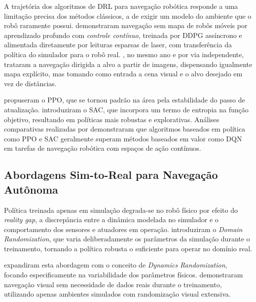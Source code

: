 A trajetória dos algoritmos de \ac{DRL} para navegação robótica responde a uma limitação precisa dos métodos clássicos, a de exigir um modelo do ambiente que o robô raramente possui. %
 demonstraram navegação sem mapa de robôs móveis por aprendizado
profundo com \emph{controle contínuo}, treinada por \ac{DDPG} assíncrono e alimentada
diretamente por leituras esparsas de laser, com transferência da política do simulador
para o robô real. , no mesmo ano e por via independente, trataram
a navegação dirigida a alvo a partir de imagens, dispensando igualmente mapa explícito,
mas tomando como entrada a cena visual e o alvo desejado em vez de distâncias.

 propuseram o \ac{PPO}, que se tornou padrão na área pela estabilidade do passo de atualização.  introduziram o \ac{SAC}, que incorpora um termo de entropia na função objetivo, resultando em políticas mais robustas e explorativas. Análises comparativas realizadas por  demonstraram que algoritmos baseados em política como \ac{PPO} e \ac{SAC} geralmente superam métodos baseados em valor como \ac{DQN} em tarefas de navegação robótica com espaços de ação contínuos.

\subsection{Abordagens Sim-to-Real para Navegação Autônoma}

Política treinada apenas em simulação degrada-se no robô físico por efeito do \textit{reality gap}, a discrepância entre a dinâmica modelada no simulador e o comportamento dos sensores e atuadores em operação.  introduziram o \textit{Domain Randomization}, que varia deliberadamente os parâmetros da simulação durante o treinamento, tornando a política robusta o suficiente para operar no domínio real.

 expandiram esta abordagem com o conceito de \textit{Dynamics Randomization}, focando especificamente na variabilidade dos parâmetros físicos.  demonstraram navegação visual sem necessidade de dados reais durante o treinamento, utilizando apenas ambientes simulados com randomização visual extensiva.

